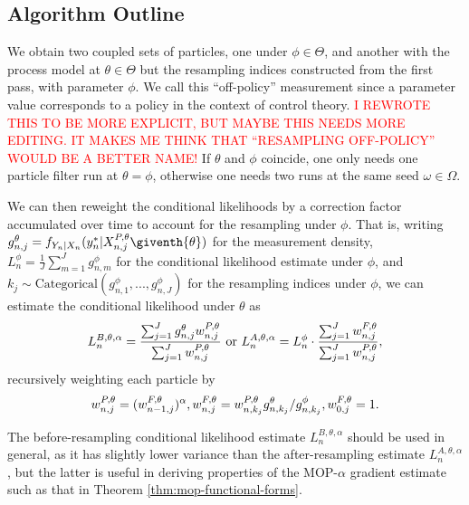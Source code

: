 \documentclass[9pt,twocolumn,twoside]{pnas-new}
\newcommand\ei[1]{\textcolor{red}{#1}}
\begin{document}
\subsection{Algorithm Outline} 
We obtain two coupled sets of particles, one under $\phi \in \Theta$, and another with the process model at $\theta \in \Theta$ but the resampling indices constructed from the first pass, with parameter $\phi$.
We call this ``off-policy'' measurement since a parameter value corresponds to a policy in the context of control theory.
\ei{I REWROTE THIS TO BE MORE EXPLICIT, BUT MAYBE THIS NEEDS MORE EDITING. IT MAKES ME THINK THAT ``RESAMPLING OFF-POLICY'' WOULD BE A BETTER NAME!}
If $\theta$ and $\phi$ coincide, one only needs one particle filter run at $\theta=\phi$, otherwise one needs two runs at the same seed $\omega \in \Omega$.

We can then reweight the conditional likelihoods by a correction factor accumulated over time to account for the resampling under $\phi$. That is, writing $g^{\theta}_{n,j}={f}_{{Y}_{n}|{X}_{n}}(y_{n}^{*}|{X}_{n,j}^{P,\theta}\giventh{\theta})$ for the measurement density, $L_n^{\phi} = \frac{1}{J}\sum_{m=1}^{J}g^{\phi}_{n,m}$ for the conditional likelihood estimate under $\phi$, and $k_j \sim \text{Categorical}(g^{\phi}_{n,1},...,g^{\phi}_{n,J})$ for the resampling indices under $\phi$, we can estimate the conditional likelihood under $\theta$ as
\vspace*{-2.5mm}
\begin{equation}
     \label{eq:mop-conditional-likelihood}
     L_n^{B,\theta,\alpha} = \frac{\sum_{j=1}^Jg^\theta_{n,j} w^{P,\theta}_{n,j}}{\sum_{j=1}^J  w^{P,\theta}_{n,j}} \text{ or } L_n^{A,\theta,\alpha} = L_n^\phi\cdot \frac{\sum_{j=1}^J w^{F,\theta}_{n,j}}{\sum_{j=1}^J  w^{P,\theta}_{n,j}},
     \vspace*{-2.5mm}
\end{equation}
recursively weighting each particle by 
\vspace*{-2.5mm}
\begin{equation}
    \label{eq:weighting-scheme}
    w_{n,j}^{P,\theta} = (w_{n-1,j}^{F,\theta})^\alpha,  w^{F,\theta}_{n,j} = w^{P,\theta}_{n,k_j} { g^{\theta}_{n,k_j}}/{ g^{\phi}_{n,k_j}}, w^{F,\theta}_{0,j}= 1.
    \vspace*{-2.5mm}
\end{equation}

The before-resampling conditional likelihood estimate $L_n^{B,\theta,\alpha}$ should be used in general, as it has slightly lower variance than the after-resampling estimate $L_n^{A,\theta,\alpha}$, but the latter is useful in deriving properties of the MOP-$\alpha$ gradient estimate such as that in Theorem \ref{thm:mop-functional-forms}.
\end{document}
